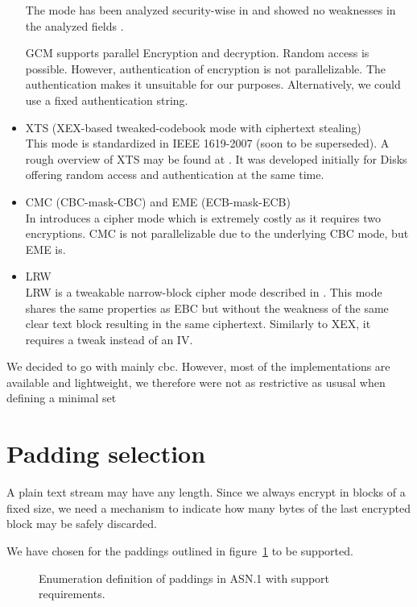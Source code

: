 \begin{itemize}
	      The mode has been analyzed security-wise in \citeyear{mcgrew2004security} and showed no weaknesses in the analyzed fields \cite{mcgrew2004security}. 
	
	      GCM supports parallel Encryption and decryption. Random access is possible. However, authentication of encryption is not parallelizable. The authentication makes it unsuitable for our purposes. Alternatively, we could use a fixed authentication string.
	\item XTS (XEX-based tweaked-codebook mode with ciphertext stealing)\\
	      This mode is standardized in IEEE 1619-2007 (soon to be superseded). A rough overview of XTS may be found at \cite{Martin2010}. It was developed initially for Disks offering random access and authentication at the same time. 
	\item CMC (CBC-mask-CBC) and EME (ECB-mask-ECB)\\ 
	      In \cite{Halevi:2003} \citeauthor{Halevi:2003} introduces a cipher mode which is extremely costly as it requires two encryptions. CMC is not parallelizable due to the underlying CBC mode, but EME is. 
	\item LRW\\
	      LRW is a tweakable narrow-block cipher mode described in \cite{tschorsch:translayeranon}. This mode shares the same properties as EBC but without the weakness of the same clear text block resulting in the same ciphertext. Similarly to XEX, it requires a tweak instead of an IV.
\end{itemize}

We decided to go with mainly cbc. However, most of the implementations are available and lightweight, we therefore were not as restrictive as ususal when defining a minimal set

\section{Padding selection}
A plain text stream may have any length. Since we always encrypt in blocks of a fixed size, we need a mechanism to indicate how many bytes of the last encrypted block may be safely discarded. 

We have chosen for the paddings outlined in figure~\ref{fig:defPaddings} to be supported.
\begin{figure}[ht]
	
	\caption{Enumeration definition of paddings in ASN.1 with support requirements.}
	\label{fig:defPaddings}
\end{figure}

